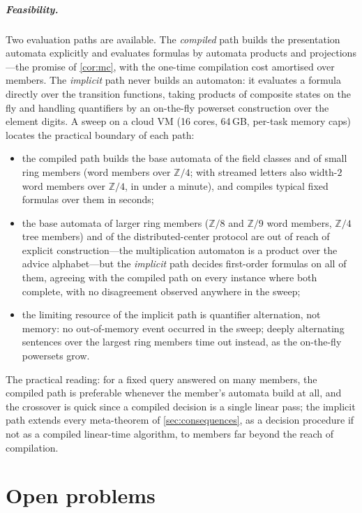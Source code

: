\documentclass[a4paper,UKenglish,autoref,anonymous]{lipics-v2021}
\newcommand{\ZZ}{\mathbb{Z}}
\begin{document}
\subparagraph*{Feasibility.}
Two evaluation paths are available. The \emph{compiled} path builds the
presentation automata explicitly and evaluates formulas by automata
products and projections---the promise of \autoref{cor:mc}, with the
one-time compilation cost amortised over members. The \emph{implicit}
path never builds an automaton: it evaluates a formula directly over
the transition functions, taking products of composite states on the
fly and handling quantifiers by an on-the-fly powerset construction
over the element digits. A sweep on a cloud VM (16 cores, 64\,GB,
per-task memory caps) locates the practical boundary of each path:
\begin{itemize}
\item the compiled path builds the base automata of the field classes
  and of small ring members (word members over $\ZZ/4$; with streamed
  letters also width-$2$ word members over $\ZZ/4$, in under a minute),
  and compiles typical fixed formulas over them in seconds;
\item the base automata of larger ring members ($\ZZ/8$ and $\ZZ/9$
  word members, $\ZZ/4$ tree members) and of the distributed-center
  protocol are out of reach of explicit construction---the
  multiplication automaton is a product over the advice alphabet---but
  the \emph{implicit} path decides first-order formulas on all of them,
  agreeing with the compiled path on every instance where both
  complete, with no disagreement observed anywhere in the sweep;
\item the limiting resource of the implicit path is quantifier
  alternation, not memory: no out-of-memory event occurred in the
  sweep; deeply alternating sentences over the largest ring members
  time out instead, as the on-the-fly powersets grow.
\end{itemize}
The practical reading: for a fixed query answered on many members, the
compiled path is preferable whenever the member's automata build at
all, and the crossover is quick since a compiled decision is a single
linear pass; the implicit path extends every meta-theorem of
\autoref{sec:consequences}, as a decision procedure if not as a
compiled linear-time algorithm, to members far beyond the reach of
compilation.

\section{Open problems}
\label{sec:open}
\end{document}
